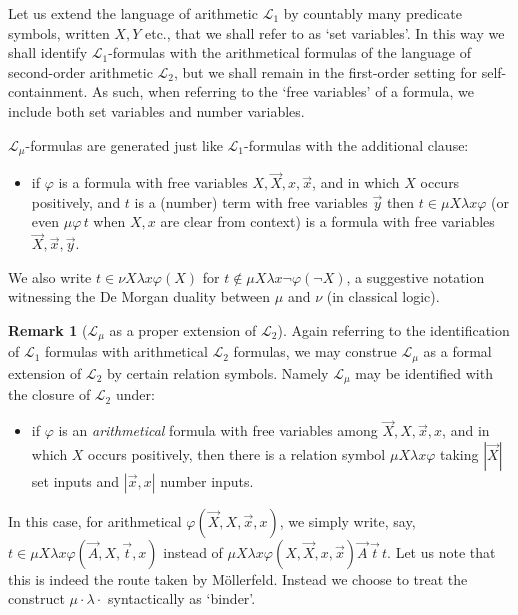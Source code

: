 \documentclass[10pt,a4paper]{amsart}
\theoremstyle{plain}
\theoremstyle{definition}
\newtheorem{remark}[remark]{Remark}
\renewcommand{\phi}{\varphi}
\newcommand{\oldtodo}[1]{\todo{#1}} %
\renewcommand{\todo}[1]{}
\theoremstyle{plain}
\theoremstyle{definition} %
\newcommand{\mufo}[3]{\mu #1 \lambda #2 #3}
\newcommand{\nufo}[3]{\nu #1 \lambda #2 #3}
\newcommand{\Lang}{\mathcal L}
\newcommand{\lang}[1]{\Lang_{#1}}
\newcommand{\langarith}{\lang 1}
\newcommand{\langsoarith}{\lang 2}
\newcommand{\langmuarith}{\lang \mu}
\begin{document}
Let us extend the language of arithmetic $\langarith$ by countably many predicate symbols, written $X,Y$ etc., that we shall refer to as `set variables'. 
In this way we shall identify $\langarith$-formulas with the arithmetical formulas of the language of second-order arithmetic $\langsoarith$, but we shall remain in the first-order setting for self-containment.
As such, when referring to the `free variables' of a formula, we include both set variables and number variables.

$\langmuarith$-formulas are generated just like $\langarith$-formulas with the additional clause:

\begin{itemize}
    \item if $\phi$ is a formula with free variables $X,\vec X, x, \vec x$, and in which $X$ occurs positively, and $t $ is a (number) term with free variables $\vec y$ then $t \in \mufo X x \phi$ \oldtodo{notation can be optimised, this is a macro} (or even $\mu \phi\, t$ when $X,x$ are clear from context) is a formula with free variables $\vec X,\vec x,\vec y$.
\end{itemize}



We also write $t \in \nufo X x \phi(X)$ for $t \notin \mufo X x \lnot \phi(\lnot X)$, a suggestive notation witnessing the De Morgan duality between $\mu$ and $\nu$ (in classical logic).

\begin{remark}
[$\langmuarith$ as a proper extension of $\langsoarith$]
\label{rem:langmuarith-extends-langsoarith}
Again referring to the identification of $\langarith$ formulas with arithmetical $\langsoarith$ formulas, we may construe $\langmuarith$ as a formal extension of $\langsoarith$ by certain relation symbols.
Namely
$\langmuarith$ may be identified with the closure of $\langsoarith$ under:
    \begin{itemize}
        \item if $\phi$ is an \emph{arithmetical} formula with free variables among $\vec X, X, \vec x, x$, and in which $X$ occurs positively, then there is a relation symbol $\mufo X x \phi$  taking $|\vec X|$ set inputs and $|\vec x,x|$ number inputs.
    \end{itemize}
In this case, for arithmetical $\phi(\vec X, X, \vec x, x)$, we simply write, say, $t \in \mufo X x {\phi(\vec A, X, \vec t, x)} $ instead of $\mufo X x {\phi(X,\vec X,x,\vec x)} \vec A \,  \vec t\, t$.
Let us note that this is indeed the route taken by M\"ollerfeld.
Instead we choose to treat the construct $\mu \cdot \lambda \cdot $ syntactically as `binder'.
\end{remark}
\end{document}
